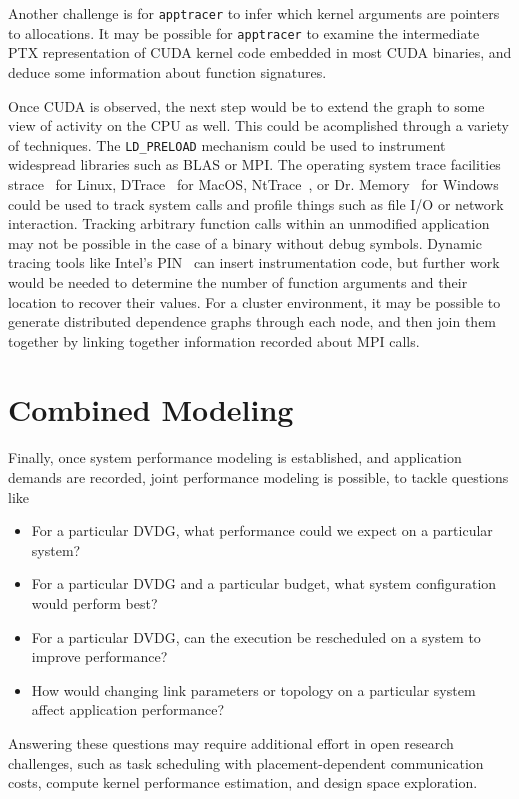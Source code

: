 Another challenge is for \texttt{apptracer} to infer which kernel arguments are pointers to allocations.
It may be possible for \texttt{apptracer} to examine the intermediate PTX representation of CUDA kernel code embedded in most CUDA binaries, and deduce some information about function signatures.

Once CUDA is observed, the next step would be to extend the graph to some view of activity on the CPU as well.
This could be acomplished through a variety of techniques.
The \texttt{LD\_PRELOAD} mechanism could be used to instrument widespread libraries such as BLAS or MPI.
The operating system trace facilities strace~\cite{strace2018} for Linux, DTrace~\cite{dtrace2008} for MacOS, NtTrace~\cite{orr2014nttrace}, or Dr. Memory~\cite{bruening2001design}\cite{drmemory2018} for Windows could be used to track system calls and profile things such as file I/O or network interaction.
Tracking arbitrary function calls within an unmodified application may not be possible in the case of a binary without debug symbols.
Dynamic tracing tools like Intel's PIN~\cite{intel2012pin} can insert instrumentation code, but further work would be needed to determine the number of function arguments and their location to recover their values.
For a cluster environment, it may be possible to generate distributed dependence graphs through each node, and then join them together by linking together information recorded about MPI calls.

\section{Combined Modeling}
\label{sec:modeling}

Finally, once system performance modeling is established, and application demands are recorded, joint performance modeling is possible, to tackle questions like
\begin{itemize}
    \item For a particular DVDG, what performance could we expect on a particular system?
    \item For a particular DVDG and a particular budget, what system configuration would perform best?
    \item For a particular DVDG, can the execution be rescheduled on a system to improve performance?
    \item How would changing link parameters or topology on a particular system affect application performance?
\end{itemize}
Answering these questions may require additional effort in open research challenges, such as task scheduling with placement-dependent communication costs, compute kernel performance estimation, and design space exploration.
